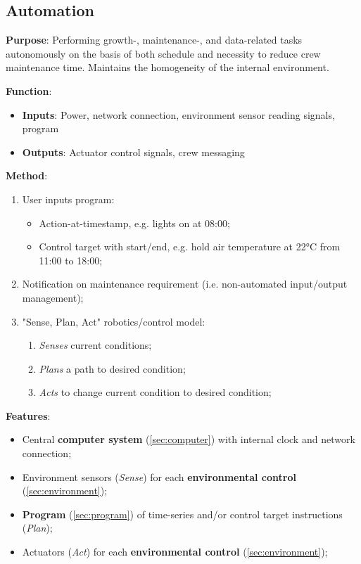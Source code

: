 \documentclass{report}
\begin{document}
\newpage

\subsection{Automation}
\label{sec:automation}

\textbf{Purpose}: Performing growth-, maintenance-, and data-related tasks autonomously on the basis of both schedule and necessity to reduce crew maintenance time. Maintains the homogeneity of the internal environment.

\textbf{Function}:
\begin{itemize}
    \item \textbf{Inputs}: Power, network connection, environment sensor reading signals, program
    \item \textbf{Outputs}: Actuator control signals, crew messaging
\end{itemize}

\textbf{Method}:
\begin{enumerate}
    \item User inputs program:
    \begin{itemize}
        \item Action-at-timestamp, e.g. lights on at 08:00;
        \item Control target with start/end, e.g. hold air temperature at 22°C from 11:00 to 18:00;
    \end{itemize}
    \item Notification on maintenance requirement (i.e. non-automated input/output management);
    \item "Sense, Plan, Act" robotics/control model:
    \begin{enumerate}
        \item \textit{Senses} current conditions;
        \item \textit{Plans} a path to desired condition;
        \item \textit{Acts} to change current condition to desired condition;
    \end{enumerate}
\end{enumerate}

\textbf{Features}:
\begin{itemize}
    \item Central \textbf{computer system} (\ref{sec:computer}) with internal clock and network connection;
    \item Environment sensors (\textit{Sense}) for each \textbf{environmental control} (\ref{sec:environment});
    \item \textbf{Program} (\ref{sec:program}) of time-series and/or control target instructions (\textit{Plan});
    \item Actuators (\textit{Act}) for each \textbf{environmental control} (\ref{sec:environment});
\end{itemize}
\end{document}
